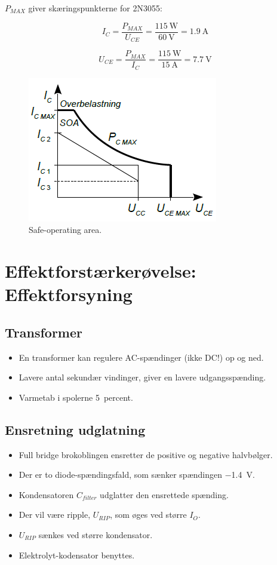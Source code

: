 \documentclass[danish]{article}
\begin{document}
$P_{MAX}$ giver skæringspunkterne for 2N3055:

\begin{equation}
I_C = \dfrac{P_{MAX}}{U_{CE}} = \dfrac{\SI{115}{\watt}}{\SI{60}{\volt}} = \SI{1.9}{\ampere}
\end{equation}

\begin{equation}
U_{CE} = \dfrac{P_{MAX}}{I_C} = \dfrac{\SI{115}{\watt}}{\SI{15}{\ampere}} = \SI{7.7}{\volt}
\end{equation}

\begin{figure} [H]
	\centering
	\includegraphics[width=0.65\linewidth]{graphics/soa}
	\caption{Safe-operating area.}
	\label{fig:soa}
\end{figure}

\newpage
\section{Effektforstærkerøvelse: Effektforsyning}

\subsection{Transformer}
\begin{itemize}
	\item En transformer kan regulere AC-spændinger (ikke DC!) op og ned.
	\item Lavere antal sekundær vindinger, giver en lavere udgangsspænding.
	\item Varmetab i spolerne \approx \SI{5}{percent}.
\end{itemize}


\subsection{Ensretning udglatning}
\begin{itemize}
	\item Full bridge brokoblingen ensretter de positive og negative halvbølger.
	\item Der er to diode-spændingsfald, som sænker spændingen \approx \SI{-1.4}{\volt}.
	\item Kondensatoren $C_{filter}$ udglatter den ensrettede spænding.
	\item Der vil være ripple, $U_{RIP}$, som øges ved større $I_O$.
	\item $U_{RIP}$ sænkes ved større kondensator.
	\item Elektrolyt-kodensator benyttes.
\end{itemize}
\end{document}
